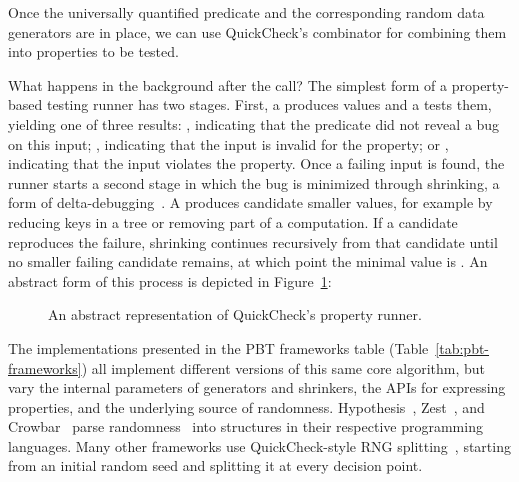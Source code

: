 Once the universally quantified predicate and the corresponding random data generators
are in place, we can use QuickCheck's  combinator for combining them into
properties to be tested.



What happens in the background after the  call? The simplest form of a
property-based testing runner has two stages. First, a \generator{} produces values and
a \checker{} tests them, yielding one of three results: \passed{}, indicating that the
predicate did not reveal a bug on this input; \discarded{}, indicating that the input
is invalid for the property; or \failed{}, indicating that the input violates the
property. Once a failing input is found, the runner starts a second stage in which the
bug is minimized through shrinking, a form of
delta-debugging~\cite{zeller2002simplifying}. A \shrinker{} produces candidate smaller
values, for example by reducing keys in a tree or removing part of a computation. If a
candidate reproduces the failure, shrinking continues recursively from that candidate
until no smaller failing candidate remains, at which point the minimal value is
. An abstract form of this process is depicted in
Figure~\ref{fig:quickcheck-property-runner-intro}:

\begin{figure}[h]
    \centering
    
    \resizebox{0.95\linewidth}{!}{}
    \caption{An abstract representation of QuickCheck's property runner.}
    \label{fig:quickcheck-property-runner-intro}
\end{figure}

The implementations presented in the PBT frameworks table
(Table~\ref{tab:pbt-frameworks}) all implement different versions of this same core
algorithm, but vary the internal parameters of generators and shrinkers, the APIs for
expressing properties, and the underlying source of randomness.
Hypothesis~\cite{Hypothesis}, Zest~\cite{Zest}, and Crowbar~\cite{Crowbar} parse
randomness~\cite{goldsteinParsingRandomness2022} into structures in their respective
programming languages. Many other frameworks use QuickCheck-style RNG
splitting~\cite{ClaessenP13}, starting from an initial random seed and splitting it at
every decision point.

